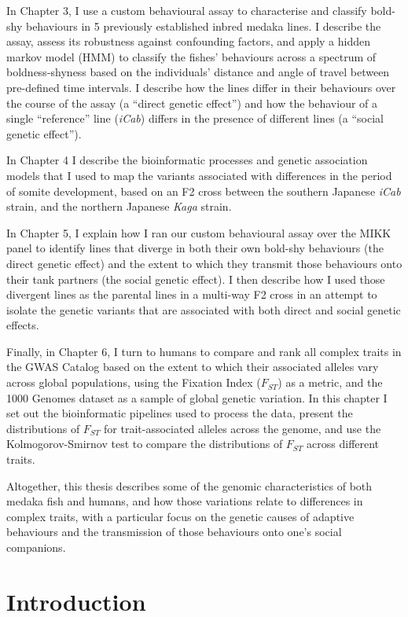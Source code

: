 \documentclass[
]{book}
\begin{document}
In Chapter 3, I use a custom behavioural assay to characterise and classify bold-shy behaviours in 5 previously established inbred medaka lines. I describe the assay, assess its robustness against confounding factors, and apply a hidden markov model (HMM) to classify the fishes' behaviours across a spectrum of boldness-shyness based on the individuals' distance and angle of travel between pre-defined time intervals. I describe how the lines differ in their behaviours over the course of the assay (a ``direct genetic effect'') and how the behaviour of a single ``reference'' line (\emph{iCab}) differs in the presence of different lines (a ``social genetic effect'').

In Chapter 4 I describe the bioinformatic processes and genetic association models that I used to map the variants associated with differences in the period of somite development, based on an F2 cross between the southern Japanese \emph{iCab} strain, and the northern Japanese \emph{Kaga} strain.

In Chapter 5, I explain how I ran our custom behavioural assay over the MIKK panel to identify lines that diverge in both their own bold-shy behaviours (the direct genetic effect) and the extent to which they transmit those behaviours onto their tank partners (the social genetic effect). I then describe how I used those divergent lines as the parental lines in a multi-way F2 cross in an attempt to isolate the genetic variants that are associated with both direct and social genetic effects.

Finally, in Chapter 6, I turn to humans to compare and rank all complex traits in the GWAS Catalog based on the extent to which their associated alleles vary across global populations, using the Fixation Index (\(F_{ST}\)) as a metric, and the 1000 Genomes dataset as a sample of global genetic variation. In this chapter I set out the bioinformatic pipelines used to process the data, present the distributions of \(F_{ST}\) for trait-associated alleles across the genome, and use the Kolmogorov-Smirnov test to compare the distributions of \(F_{ST}\) across different traits.

Altogether, this thesis describes some of the genomic characteristics of both medaka fish and humans, and how those variations relate to differences in complex traits, with a particular focus on the genetic causes of adaptive behaviours and the transmission of those behaviours onto one's social companions.

\hypertarget{Introduction}{%
\chapter{Introduction}\label{Introduction}}
\end{document}
